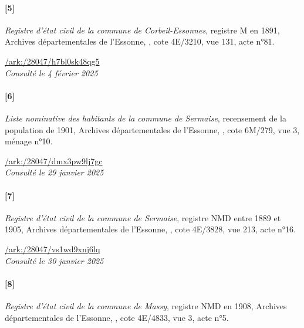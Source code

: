 \documentclass[../eBook.tex]{subfiles}
\begin{document}
      \paragraph{[5]}\textit{Registre d'état civil de la commune de Corbeil-Essonnes}, registre M en 1891, Archives départementales de l’Essonne, , cote 4E/3210, vue 131, acte n°81.
      \medskip

      \hspace*{\fill}\href{https://archives.essonne.fr/ark:/28047/h7bl0sk48qg5/3d3ec9db-364d-45d5-8f27-a290fdeb022b}{\color{blue}/ark:/28047/h7bl0sk48qg5}\\
      \hspace*{\fill}\textit{Consulté le 4 février 2025}
      \paragraph{[6]}\textit{Liste nominative des habitants de la commune de Sermaise}, recensement de la population de 1901, Archives départementales de l’Essonne, , cote 6M/279, vue 3, ménage n°10.
      \medskip

      \hspace*{\fill}\href{https://archives.essonne.fr/ark:/28047/dmx3pw9lj7gc/7a92f1bf-1fd2-4549-8d7f-c9b250262e85}{\color{blue}/ark:/28047/dmx3pw9lj7gc}\\
      \hspace*{\fill}\textit{Consulté le 29 janvier 2025}
      \paragraph{[7]}\textit{Registre d'état civil de la commune de Sermaise}, registre NMD entre 1889 et 1905, Archives départementales de l’Essonne, , cote 4E/3828, vue 213, acte n°16.
      \medskip

      \hspace*{\fill}\href{https://archives.essonne.fr/ark:/28047/vs1wd9xnj6lq/b79e3835-828c-4169-a897-6eb3cff121d2}{\color{blue}/ark:/28047/vs1wd9xnj6lq}\\
      \hspace*{\fill}\textit{Consulté le 30 janvier 2025}
      \paragraph{[8]}\textit{Registre d'état civil de la commune de Massy}, registre NMD en 1908, Archives départementales de l’Essonne, , cote 4E/4833, vue 3, acte n°5.
      \medskip
\end{document}
